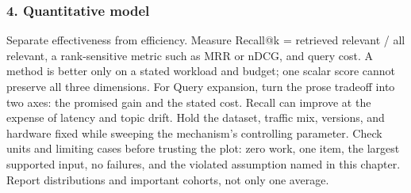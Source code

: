 \subsubsection*{4. Quantitative model}
Separate effectiveness from efficiency. Measure Recall@k = retrieved relevant / all relevant, a rank-sensitive metric such as MRR or nDCG, and query cost. A method is better only on a stated workload and budget; one scalar score cannot preserve all three dimensions.
For Query expansion, turn the prose tradeoff into two axes: the promised gain and the stated cost. Recall can improve at the expense of latency and topic drift. Hold the dataset, traffic mix, versions, and hardware fixed while sweeping the mechanism's controlling parameter.
Check units and limiting cases before trusting the plot: zero work, one item, the largest supported input, no failures, and the violated assumption named in this chapter. Report distributions and important cohorts, not only one average.
